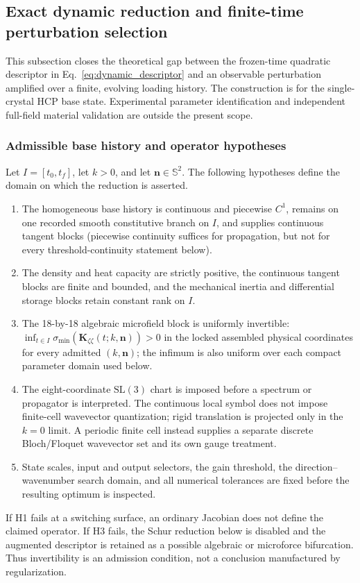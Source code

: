 \subsection{Exact dynamic reduction and finite-time perturbation selection}
\label{subsec:dynamic_finite_time_operator}

This subsection closes the theoretical gap between the frozen-time quadratic
descriptor in Eq.~\eqref{eq:dynamic_descriptor} and an observable perturbation
amplified over a finite, evolving loading history.  The construction is for the
single-crystal HCP base state.  Experimental parameter identification and
independent full-field material validation are outside the present scope.

\subsubsection{Admissible base history and operator hypotheses}

Let $I=[t_0,t_f]$, let $k>0$, and let $\boldsymbol n\in\mathbb S^2$.  The
following hypotheses define the domain on which the reduction is asserted.
\begin{enumerate}
\item[(H1)] The homogeneous base history is continuous and piecewise $C^1$,
  remains on one recorded smooth constitutive branch on $I$, and supplies
  continuous tangent blocks (piecewise continuity suffices for propagation,
  but not for every threshold-continuity statement below).
\item[(H2)] The density and heat capacity are strictly positive, the continuous
  tangent blocks are finite and bounded, and the mechanical inertia and
  differential storage blocks retain constant rank on $I$.
\item[(H3)] The 18-by-18 algebraic microfield block is uniformly invertible:
  $\inf_{t\in I}\sigma_{\min}
  (\boldsymbol K_{\zeta\zeta}(t;k,\boldsymbol n))>0$ in the locked assembled
  physical coordinates for every admitted $(k,\boldsymbol n)$; the infimum is
  also uniform over each compact parameter domain used below.
\item[(H4)] The eight-coordinate $\mathrm{SL}(3)$ chart is imposed before a
  spectrum or propagator is interpreted.  The continuous local symbol does not
  impose finite-cell wavevector quantization; rigid translation is projected
  only in the $k=0$ limit.  A periodic finite cell instead supplies a separate
  discrete Bloch/Floquet wavevector set and its own gauge treatment.
\item[(H5)] State scales, input and output selectors, the gain threshold, the
  direction--wavenumber search domain, and all numerical tolerances are fixed
  before the resulting optimum is inspected.
\end{enumerate}
If H1 fails at a switching surface, an ordinary Jacobian does not define the
claimed operator.  If H3 fails, the Schur reduction below is disabled and the
augmented descriptor is retained as a possible algebraic or microforce
bifurcation.  Thus invertibility is an admission condition, not a conclusion
manufactured by regularization.

